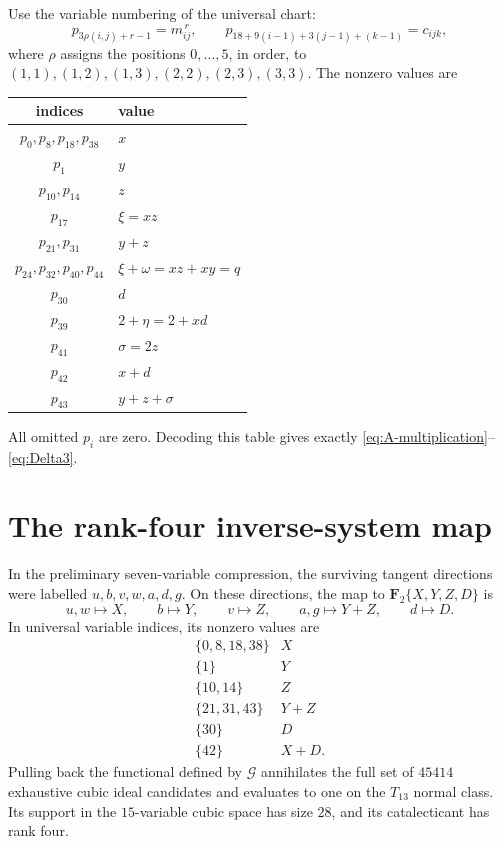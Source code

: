 \documentclass[11pt]{article}
\theoremstyle{remark}
\newcommand{\F}{\mathbf F}
\begin{document}
Use the variable numbering of the universal chart:
\[
 p_{3\rho(i,j)+r-1}=m_{ij}^{\,r},\qquad
 p_{18+9(i-1)+3(j-1)+(k-1)}=c_{ijk},
\]
where \(\rho\) assigns the positions \(0,\ldots,5\), in order, to
\((1,1),(1,2),(1,3),(2,2),(2,3),(3,3)\).
The nonzero values are
\begin{center}
\begin{longtable}{@{}cl@{}}
\toprule
indices & value\\
\midrule
\endhead
\(p_0,p_8,p_{18},p_{38}\) & \(x\)\\
\(p_1\) & \(y\)\\
\(p_{10},p_{14}\) & \(z\)\\
\(p_{17}\) & \(\xi=xz\)\\
\(p_{21},p_{31}\) & \(y+z\)\\
\(p_{24},p_{32},p_{40},p_{44}\) & \(\xi+\omega=xz+xy=q\)\\
\(p_{30}\) & \(d\)\\
\(p_{39}\) & \(2+\eta=2+xd\)\\
\(p_{41}\) & \(\sigma=2z\)\\
\(p_{42}\) & \(x+d\)\\
\(p_{43}\) & \(y+z+\sigma\)\\
\bottomrule
\end{longtable}
\end{center}
All omitted \(p_i\) are zero.  Decoding this table gives exactly
\eqref{eq:A-multiplication}--\eqref{eq:Delta3}.

\section{The rank-four inverse-system map}

In the preliminary seven-variable compression, the surviving tangent
directions were labelled \(u,b,v,w,a,d,g\).  On these directions, the map
to \(\F_2\{X,Y,Z,D\}\) is
\[
 u,w\longmapsto X,\qquad b\longmapsto Y,
 \qquad v\longmapsto Z,
 \qquad a,g\longmapsto Y+Z,
 \qquad d\longmapsto D.
\]
In universal variable indices, its nonzero values are
\[
\begin{array}{c|c}
\{0,8,18,38\}&X\\
\{1\}&Y\\
\{10,14\}&Z\\
\{21,31,43\}&Y+Z\\
\{30\}&D\\
\{42\}&X+D.
\end{array}
\]
Pulling back the functional defined by \(\mathcal G\) annihilates the full
set of \(45414\) exhaustive cubic ideal candidates and evaluates to one on
the \(T_{13}\) normal class.  Its support in the \(15\)-variable cubic space
has size \(28\), and its catalecticant has rank four.
\end{document}
